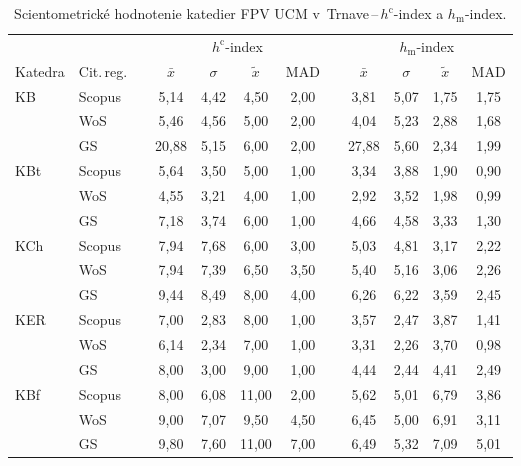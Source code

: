 \begin{table}
  \centering\small
  \caption[Hodnotenie FPV\,--\,$h^{\mathrm{c}}$-index a $h_{\mathrm{m}}$-index]%
  {Scientometrické hodnotenie katedier FPV UCM v~Trnave\,--\,$h^{\mathrm{c}}$-index a $h_{\mathrm{m}}$-index.}
  \label{tab:6-staff.results}
  \begin{tabularx}{\textwidth}{XXp{1ex}ccccp{1ex}cccc}
    \toprule
    & & & \multicolumn{4}{c}{$h^{\mathrm{c}}$-index} & & \multicolumn{4}{c}{$h_{\mathrm{m}}$-index} \\
    \cmidrule{4-7}\cmidrule{9-12}
    Katedra & Cit.\,reg. & & $\bar{x}$ & $\sigma$ & $\tilde{x}$ & MAD & & $\bar{x}$ & $\sigma$ & $\tilde{x}$ & MAD \\
    \midrule
    KB   & Scopus & & 5,14  & 4,42 & 4,50  & 2,00 & & 3,81  & 5,07 & 1,75 & 1,75 \\
         & WoS    & & 5,46  & 4,56 & 5,00  & 2,00 & & 4,04  & 5,23 & 2,88 & 1,68 \\
         & GS     & & 20,88 & 5,15 & 6,00  & 2,00 & & 27,88 & 5,60 & 2,34 & 1,99 \\[1ex]
    KBt  & Scopus & & 5,64  & 3,50 & 5,00  & 1,00 & & 3,34  & 3,88 & 1,90 & 0,90 \\
         & WoS    & & 4,55  & 3,21 & 4,00  & 1,00 & & 2,92  & 3,52 & 1,98 & 0,99 \\
         & GS     & & 7,18  & 3,74 & 6,00  & 1,00 & & 4,66  & 4,58 & 3,33 & 1,30 \\[1ex]
    KCh  & Scopus & & 7,94  & 7,68 & 6,00  & 3,00 & & 5,03  & 4,81 & 3,17 & 2,22 \\
         & WoS    & & 7,94  & 7,39 & 6,50  & 3,50 & & 5,40  & 5,16 & 3,06 & 2,26 \\
         & GS     & & 9,44  & 8,49 & 8,00  & 4,00 & & 6,26  & 6,22 & 3,59 & 2,45 \\[1ex]
    KER  & Scopus & & 7,00  & 2,83 & 8,00  & 1,00 & & 3,57  & 2,47 & 3,87 & 1,41 \\
         & WoS    & & 6,14  & 2,34 & 7,00  & 1,00 & & 3,31  & 2,26 & 3,70 & 0,98 \\
         & GS     & & 8,00  & 3,00 & 9,00  & 1,00 & & 4,44  & 2,44 & 4,41 & 2,49 \\[1ex]
    KBf  & Scopus & & 8,00  & 6,08 & 11,00 & 2,00 & & 5,62  & 5,01 & 6,79 & 3,86 \\
         & WoS    & & 9,00  & 7,07 & 9,50  & 4,50 & & 6,45  & 5,00 & 6,91 & 3,11 \\
         & GS     & & 9,80  & 7,60 & 11,00 & 7,00 & & 6,49  & 5,32 & 7,09 & 5,01 \\[1ex]

\end{tabularx}
\end{table}
